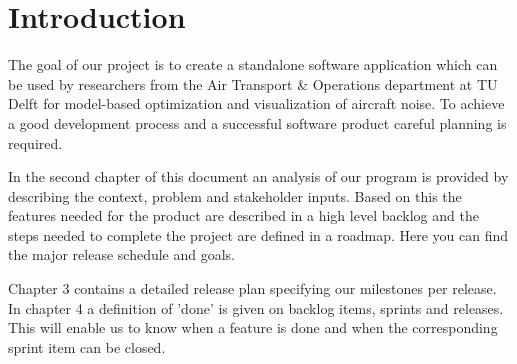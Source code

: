 \section{Introduction}

The goal of our project is to create a standalone software application which can be used by researchers from the Air Transport \& Operations department at TU Delft for model-based optimization and visualization of aircraft noise. To achieve a good development process and a successful software product careful planning is required.

In the second chapter of this document an analysis of our program is provided by describing the context, problem and stakeholder inputs. Based on this the features needed for the product are described in a high level backlog and the steps needed to complete the project are defined in a roadmap. Here you can find the major release schedule and goals.

Chapter 3 contains a detailed release plan specifying our milestones per release. In chapter 4 a definition of 'done' is given on backlog items, sprints and releases. This will enable us to know when a feature is done and when the corresponding sprint item can be closed. 
